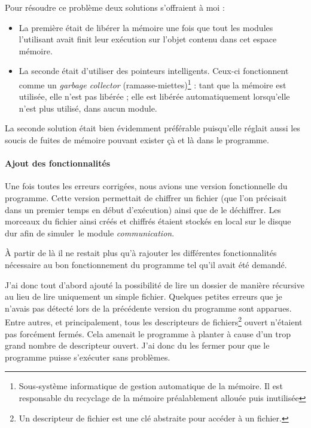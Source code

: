 \documentclass[a4paper,10pt, twoside]{report}
\begin{document}
\begin{spacing}{1.2}
Pour r\'esoudre ce probl\`eme deux solutions s'offraient \`a moi :
\begin{itemize}
 \item La premi\`ere \'etait de lib\'erer la m\'emoire une fois que tout les
 modules l'utilisant avait finit leur ex\'ecution sur l'objet contenu dans cet
 espace m\'emoire.
 \item La seconde \'etait d'utiliser des pointeurs intelligents. Ceux-ci
 fonctionnent comme un \textit{garbage collector} (ramasse-miettes)\footnote{
 Sous-syst\`eme informatique de gestion automatique de la m\'emoire. Il est
 responsable du recyclage de la m\'emoire pr\'ealablement allou\'ee puis
 inutilis\'ee} : tant que la m\'emoire est utilis\'ee, elle n'est pas
 lib\'er\'ee ; elle est lib\'er\'ee automatiquement lorsqu'elle n'est plus
 utilis\'e, dans aucun module.
\end{itemize}

La seconde solution \'etait bien \'evidemment pr\'ef\'erable puisqu'elle
r\'eglait aussi les soucis de fuites de m\'emoire pouvant exister \c{c}\`a et
l\`a dans le programme.

\paragraph{Ajout des fonctionnalit\'es}
Une fois toutes les erreurs corrig\'ees, nous avions une version fonctionnelle
du programme. Cette version permettait de chiffrer un fichier (que l'on
pr\'ecisait dans un premier temps en d\'ebut d'ex\'ecution) ainsi que de le
d\'echiffrer. Les morceaux du fichier ainsi cr\'e\'es et chiffr\'es \'etaient
stock\'es en local sur le disque dur afin de \flqq simuler\frqq~le module
\textit{communication}.

\`A partir de l\`a il ne restait plus qu'\`a rajouter les diff\'erentes
fonctionnalit\'es n\'ecessaire au bon fonctionnement du programme tel qu'il
avait \'et\'e demand\'e.

J'ai donc tout d'abord ajout\'e la possibilit\'e de lire un dossier de
mani\`ere r\'ecursive au lieu de lire uniquement un simple fichier. Quelques
petites erreurs que je n'avais pas d\'etect\'e lors de la pr\'ec\'edente
version du programme sont apparues. Entre autres, et principalement, tous les
descripteurs de fichiers\footnote{Un descripteur de fichier est une cl\'e
abstraite pour acc\'eder \`a un fichier.} ouvert n'\'etaient pas forc\'ement
ferm\'es. Cela amenait le programme \`a planter \`a cause d'un trop grand
nombre de descripteur ouvert. J'ai donc du les fermer pour que le programme
puisse s'ex\'ecuter sans probl\`emes.


\end{spacing}
\end{document}
